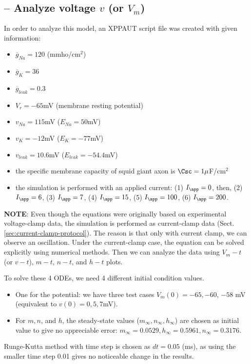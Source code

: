 \subsection{-- Analyze voltage $v$ (or $V_m$)}
\label{sec:analyze-voltage-v}

In order to analyze this model, an XPPAUT script file was created with
given information:
\begin{itemize}
\item $\overline{g}_{Na} = 120$ (mmho/cm$^2$)
\item $\overline{g}_{K} = 36$
\item $\overline{g}_{leak} = 0.3$
\item $V_r = -65$mV (membrane resting potential)
\item $v_{Na} = 115$mV ($E_{Na} = 50$mV)
\item $v_{K} = -12$mV ($E_{K} = -77$mV)
\item $v_{leak} = 10.6$mV ($E_{leak} = -54.4$mV)
\item the specific membrane capacity of squid giant axon is
  $\Csc=1\mu$F/cm$^2$
\item the simulation is performed with an applied current: (1)
  $I_\app=0$, then, (2) $I_\app=6$, (3) $I_\app=7$, (4)
  $I_\app=15$, (5) $I_\app=100$, (6) $I_\app=200$.
\end{itemize}

{\bf NOTE}: Even though the equations were originally based on
experimental voltage-clamp data, the simulation is performed as
current-clamp data (Sect.\ref{sec:current-clamp-protocol}). The reason is that
only with current clamp, we can observe an oscillation. Under the current-clamp case, the equation can
be solved explicitly using numerical methods. Then we can analyze the
data using $V_m-t$ (or $v-t$), $m-t$, $n-t$, and $h-t$ plots.

To solve these 4 ODEs, we need 4 different initial condition values.
\begin{itemize}
\item One for the potential: we have three test cases $V_m(0)=-65,
  -60$, $-58$ mV (equivalent to $v(0)=0,5,7$mV).
\item For $m, n$, and $h$, the steady-state values ($m_\infty,
  n_\infty, h_\infty$) are chosen as initial value to give no
  appreciable error: $m_\infty=0.0529, h_\infty=0.5961,
  n_\infty=0.3176$.
\end{itemize}

\begin{mdframed}
  Runge-Kutta method with time step is chosen as $dt=0.05$ (ms), as
  using the smaller time step 0.01 gives no noticeable change in the
  results.
\end{mdframed}

